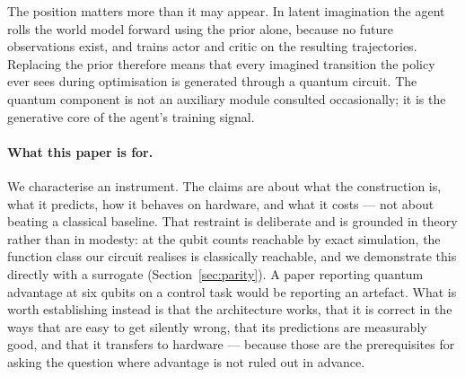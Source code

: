 \documentclass[11pt,onecolumn]{article}
\begin{document}
The position matters more than it may appear. In latent imagination the
agent rolls the world model forward using the prior alone, because no
future observations exist, and trains actor and critic on the resulting
trajectories. Replacing the prior therefore means that every imagined
transition the policy ever sees during optimisation is generated through
a quantum circuit. The quantum component is not an auxiliary module
consulted occasionally; it is the generative core of the agent's
training signal.

\paragraph{What this paper is for.}
We characterise an instrument. The claims are about what the
construction is, what it predicts, how it behaves on hardware, and what
it costs --- not about beating a classical baseline. That restraint is
deliberate and is grounded in theory rather than in modesty: at the
qubit counts reachable by exact simulation, the function class our
circuit realises is classically reachable, and we demonstrate this
directly with a surrogate (Section~\ref{sec:parity}). A paper reporting
quantum advantage at six qubits on a control task would be reporting an
artefact. What is worth establishing instead is that the architecture
works, that it is correct in the ways that are easy to get silently
wrong, that its predictions are measurably good, and that it transfers
to hardware --- because those are the prerequisites for asking the
question where advantage is not ruled out in advance.
\end{document}

